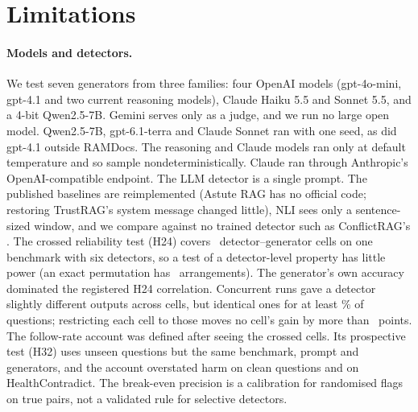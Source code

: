 \section*{Limitations}

\paragraph{Models and detectors.} We test seven generators from three families: four OpenAI models (gpt-4o-mini,
gpt-4.1 and two current reasoning models), Claude Haiku 5.5 and Sonnet 5.5, and a 4-bit Qwen2.5-7B. Gemini
serves only as a judge, and we run no large open model. Qwen2.5-7B, gpt-6.1-terra and Claude Sonnet ran with one seed,
as did gpt-4.1 outside RAMDocs. The reasoning and Claude models ran only at default temperature and so sample
nondeterministically. Claude ran through Anthropic's OpenAI-compatible endpoint. The LLM detector is a single
prompt. The published baselines are reimplemented (Astute RAG has no official code; restoring TrustRAG's system message
changed little), NLI sees only a sentence-sized window, and we compare against no trained detector such as
ConflictRAG's \citep{wang2026conflictrag}. The crossed reliability test (H24) covers \hTwentyFourCells\
detector--generator cells on one benchmark with six detectors, so a test of a detector-level property has little
power (an exact permutation has \hRedoNPerm\ arrangements). The generator's own accuracy dominated the
registered H24 correlation. Concurrent runs gave a detector slightly different outputs across cells, but identical
ones for at least \frozenShareMin\% of questions; restricting each cell to those moves no
cell's gain by more than \frozenMaxShift\ points. The follow-rate account was defined after seeing the crossed cells. Its prospective
test (H32) uses unseen questions but the same benchmark, prompt and generators, and the account overstated harm on
clean questions and on HealthContradict. The break-even precision is a calibration for randomised flags on true pairs, not a validated
rule for selective detectors.

